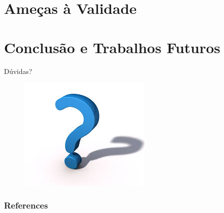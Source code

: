\documentclass[t,14pt,mathserif]{beamer}
\begin{document}
\section{Ameças à Validade}

\section{Conclusão e Trabalhos Futuros}

\begin{frame}{Dúvidas?}
	\begin{figure}[hbtp]
		\centering
	    \includegraphics[scale=1]{../img/questions.jpg}
	\end{figure}
\end{frame}

\begin{frame}[allowframebreaks]
   \frametitle{References}
   
   
\end{frame}
\end{document}
